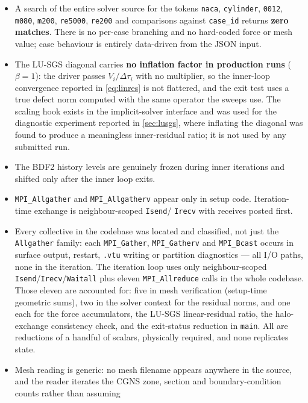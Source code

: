 \begin{itemize}
  \item A search of the entire solver source for the tokens
  \texttt{naca}, \texttt{cylinder}, \texttt{0012}, \texttt{m080}, \texttt{m200},
  \texttt{re5000}, \texttt{re200} and comparisons against \texttt{case\_id}
  returns \textbf{zero matches}. There is no per-case branching and no hard-coded
  force or mesh value; case behaviour is entirely data-driven from the JSON input.
  \item The LU-SGS diagonal carries \textbf{no inflation factor in production
  runs} ($\beta=1$): the driver passes $V_i/\Delta\tau_i$ with no multiplier, so the
  inner-loop convergence reported in \cref{eq:linres} is not flattered, and the exit
  test uses a true defect norm computed with the same operator the sweeps use. The
  scaling hook exists in the implicit-solver interface and was used for the
  diagnostic experiment reported in \cref{sec:lusgs}, where inflating the diagonal
  was found to produce a meaningless inner-residual ratio; it is not used by any
  submitted run.
  \item The BDF2 history levels are genuinely frozen during inner iterations and
  shifted only after the inner loop exits.
  \item \texttt{MPI\_Allgather} and \texttt{MPI\_Allgatherv} appear only in
  setup code. Iteration-time exchange is neighbour-scoped \texttt{Isend}/%
  \texttt{Irecv} with receives posted first.
  \item Every collective in the codebase was located and classified, not just the
  \texttt{Allgather} family: each \texttt{MPI\_Gather}, \texttt{MPI\_Gatherv} and
  \texttt{MPI\_Bcast} occurs in surface output, restart, \texttt{.vtu} writing or partition
  diagnostics --- all I/O paths, none in the iteration. The iteration loop uses only
  neighbour-scoped \texttt{Isend}/\texttt{Irecv}/\texttt{Waitall} plus eleven
  \texttt{MPI\_Allreduce} calls in the whole codebase. Those eleven are accounted for:
  five in mesh verification (setup-time geometric sums), two in the solver context for the
  residual norms, and one each for the force accumulators, the LU-SGS linear-residual ratio,
  the halo-exchange consistency check, and the exit-status reduction in \texttt{main}. All
  are reductions of a handful of scalars, physically required, and none replicates state.
  \item Mesh reading is generic: no mesh filename appears anywhere in the source, and the
  reader iterates the CGNS zone, section and boundary-condition counts rather than assuming

\end{itemize}
